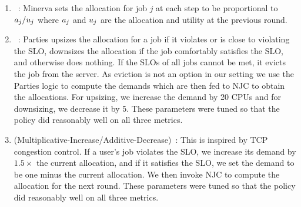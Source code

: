 \begin{enumerate}[label=\arabic*)]
    \item \minerva~\cite{nathan2019end}: 
    Minerva sets the allocation for
    job $j$ at each step to be proportional to $a_{j}/u_{j}$ where $a_{j}$ and $u_{j}$ are the
    allocation and utility at the previous round.
    
    \item \parties~\cite{chen2019parties}: 
    Parties upsizes the allocation for a job
    if it violates or is close to violating the SLO, downsizes the allocation if the job comfortably
    satisfies the SLO, and otherwise does nothing.
    If the SLOs of all jobs cannot be met, it evicts the job from the server.
    As eviction is not an option in our setting %
    we use the Parties logic to compute the demands which are then fed to NJC to obtain the allocations.
    For upsizing, we increase the demand by 20 CPUs and for downsizing, we decrease it by 5.
    These parameters were tuned so that the policy did reasonably well on all three metrics.  
    
    \item \AIMD{} (Multiplicative-Increase/Additive-Decrease)~\cite{chiu1989analysis}: 
    This is inspired by TCP congestion control.
    If a user's job violates the SLO, we increase its demand by $1.5\times$ the current allocation,
    and if it satisfies the SLO, we set the demand to be one minus the current allocation.
    We then invoke NJC to compute the allocation for the next round.
    These parameters were tuned so that the policy did reasonably well on all three metrics.
    \end{enumerate}


